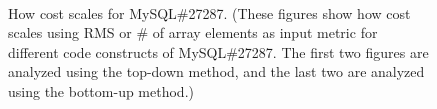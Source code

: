 \begin{figure}
\centering
{} 
 \\ 
\vspace{-0.1in}
\caption{How cost scales for MySQL\#27287. 
\footnotesize{(These figures show how cost scales using RMS or \# of array elements 
as input metric for different code constructs of MySQL\#27287. 
The first two figures are analyzed using the top-down method, 
and the last two are analyzed using the bottom-up method.)}} 
\label{fig:cost} 
\vspace{-0.15in}
\end{figure} 
 

